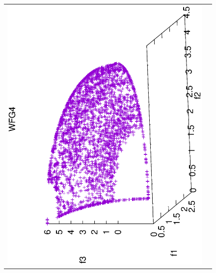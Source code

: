 \begin{figure}[H]
\begin{tabular}{cc}
  \includegraphics[scale=0.3, angle=-90,origin=c]{Figures_Chapter7/Results_Chapter4/Summary_Representative/VSD-MOEA/WFG4.eps} &

\end{tabular}
\end{figure}
